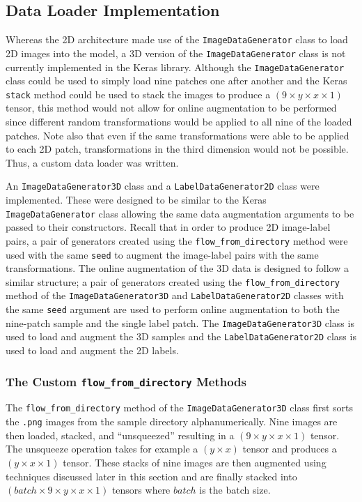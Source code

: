 \subsection{Data Loader Implementation}

Whereas the 2D architecture made use of the \texttt{ImageDataGenerator} class to load 2D images into the model, a 3D version of the \texttt{ImageDataGenerator} class is not currently implemented in the Keras library. Although the \texttt{ImageDataGenerator} class could be used to simply load nine patches one after another and the Keras \texttt{stack} method could be used to stack the images to produce a $(9 \times y \times x \times 1)$ tensor, this method would not allow for online augmentation to be performed since different random transformations would be applied to all nine of the loaded patches. Note also that even if the same transformations were able to be applied to each 2D patch, transformations in the third dimension would not be possible. Thus, a custom data loader was written.

An \texttt{ImageDataGenerator3D} class and a \texttt{LabelDataGenerator2D} class were implemented. These were designed to be similar to the Keras \texttt{ImageDataGenerator} class allowing the same data augmentation arguments to be passed to their constructors. Recall that in order to produce 2D image-label pairs, a pair of generators created using the \texttt{flow\_from\_directory} method were used with the same \texttt{seed} to augment the image-label pairs with the same transformations. The online augmentation of the 3D data is designed to follow a similar structure; a pair of generators created using the \texttt{flow\_from\_directory} method of the \texttt{ImageDataGenerator3D} and \texttt{LabelDataGenerator2D} classes with the same \texttt{seed} argument are used to perform online augmentation to both the nine-patch sample and the single label patch. The \texttt{ImageDataGenerator3D} class is used to load and augment the 3D samples and the \texttt{LabelDataGenerator2D} class is used to load and augment the 2D labels.

\subsubsection{The Custom \texttt{flow\_from\_directory} Methods}

The \texttt{flow\_from\_directory} method of the \texttt{ImageDataGenerator3D} class first sorts the \texttt{.png} images from the sample directory alphanumerically. Nine images are then loaded, stacked, and ``unsqueezed'' resulting in a $(9 \times y \times x \times 1)$ tensor. The unsqueeze operation takes for example a $(y \times x)$ tensor and produces a $(y \times x \times 1)$ tensor. These stacks of nine images are then augmented using techniques discussed later in this section and are finally stacked into $(batch \times 9 \times y \times x \times 1)$ tensors where $batch$ is the batch size.

